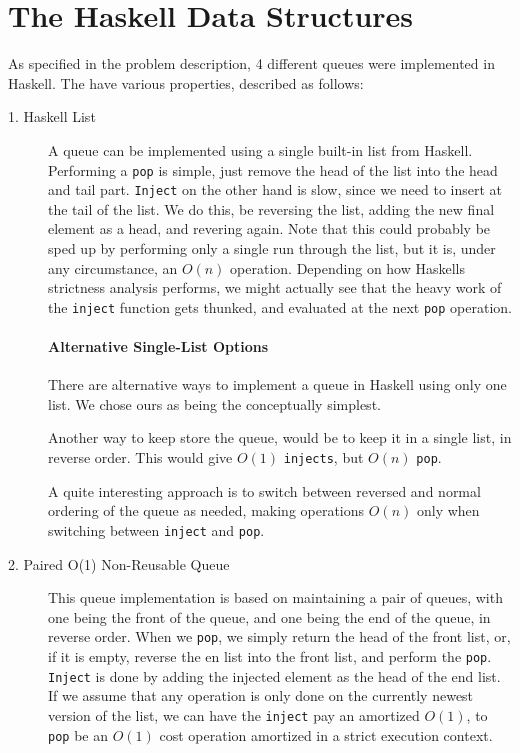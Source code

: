 \section{The Haskell Data Structures}

As specified in the problem description, 4 different queues were implemented in Haskell. The have various properties, described as follows:

\begin{description}
\item[1. Haskell List] 
A queue can be implemented using a single built-in list from Haskell. 
Performing a \texttt{pop} is simple, just remove the head of the list into the head and tail part.
\texttt{Inject} on the other hand is slow, since we need to insert at the tail of the list. We do this, be reversing the list, adding the new final element as a head, and revering again. Note that this could probably be sped up by performing only a single run through the list, but it is, under any circumstance, an $O(n)$ operation.
Depending on how Haskells strictness analysis performs, we might actually see that the heavy work of the \texttt{inject} function gets thunked, and evaluated at the next \texttt{pop} operation.

\paragraph{Alternative Single-List Options}

There are alternative ways to implement a queue in Haskell using only one list. We chose ours as being the conceptually simplest.

Another way to keep store the queue, would be to keep it in a single list, in reverse order. This would give $O(1)$ \texttt{injects}, but $O(n)$ \texttt{pop}.

A quite interesting approach is to switch between reversed and normal ordering of the queue as needed, making operations $O(n)$ only when switching between \texttt{inject} and \texttt{pop}. 

\item[2. Paired O(1) Non-Reusable Queue]
This queue implementation is based on maintaining a pair of queues, with one being the front of the queue, and one being the end of the queue, in reverse order. 
When we \texttt{pop}, we simply return the head of the front list, or, if it is empty, reverse the en list into the front list, and perform the \texttt{pop}.
\texttt{Inject} is done by adding the injected element as the head of the end list.
If we assume that any operation is only done on the currently newest version of the list, we can have the \texttt{inject} pay an amortized $O(1)$, to \texttt{pop} be an $O(1)$ cost operation amortized in a strict execution context.


\end{description}
